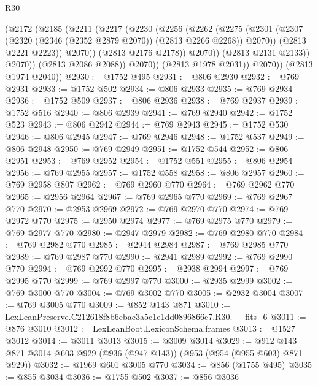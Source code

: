 \begin{lexlean}{R30}
\begin{coremodule}
                    (@2172
                      (@2185
                        (@2211
                          (@2217
                            (@2230
                              (@2256
                                (@2262
                                  (@2275
                                    (@2301
                                      (@2307
                                        (@2320 (@2346 (@2352 @2879 @2070)) (@2813 @2266 @2268))
                                        @2070))
                                    (@2813 @2221 @2223))
                                  @2070))
                              (@2813 @2176 @2178))
                            @2070))
                        (@2813 @2131 @2133))
                      @2070))
                  (@2813 @2086 @2088))
                @2070))
            (@2813 @1978 @2031))
          @2070))
      (@2813 @1974 @2040))
@2930 := @1752 @495
@2931 := @806 @2930
@2932 := @769 @2931
@2933 := @1752 @502
@2934 := @806 @2933
@2935 := @769 @2934
@2936 := @1752 @509
@2937 := @806 @2936
@2938 := @769 @2937
@2939 := @1752 @516
@2940 := @806 @2939
@2941 := @769 @2940
@2942 := @1752 @523
@2943 := @806 @2942
@2944 := @769 @2943
@2945 := @1752 @530
@2946 := @806 @2945
@2947 := @769 @2946
@2948 := @1752 @537
@2949 := @806 @2948
@2950 := @769 @2949
@2951 := @1752 @544
@2952 := @806 @2951
@2953 := @769 @2952
@2954 := @1752 @551
@2955 := @806 @2954
@2956 := @769 @2955
@2957 := @1752 @558
@2958 := @806 @2957
@2960 := @769 @2958 @807
@2962 := @769 @2960 @770
@2964 := @769 @2962 @770
@2965 := @2956 @2964
@2967 := @769 @2965 @770
@2969 := @769 @2967 @770
@2970 := @2953 @2969
@2972 := @769 @2970 @770
@2974 := @769 @2972 @770
@2975 := @2950 @2974
@2977 := @769 @2975 @770
@2979 := @769 @2977 @770
@2980 := @2947 @2979
@2982 := @769 @2980 @770
@2984 := @769 @2982 @770
@2985 := @2944 @2984
@2987 := @769 @2985 @770
@2989 := @769 @2987 @770
@2990 := @2941 @2989
@2992 := @769 @2990 @770
@2994 := @769 @2992 @770
@2995 := @2938 @2994
@2997 := @769 @2995 @770
@2999 := @769 @2997 @770
@3000 := @2935 @2999
@3002 := @769 @3000 @770
@3004 := @769 @3002 @770
@3005 := @2932 @3004
@3007 := @769 @3005 @770
@3009 := @852 @143 @871
@3010 := LexLeanPreserve.C212618f8b6ebac3a5c1e1dd0896866e7.R30.__fits_6
@3011 := @876 @3010
@3012 := LexLeanBoot.LexiconSchema.frames
@3013 := @1527 @3012
@3014 := @3011 @3013
@3015 := @3009 @3014
@3029 := @912 @143 @871 @3014 @603 @929 (@936 (@947 @143)) (@953 (@954 (@955 @603) @871 @929))
@3032 := @1969 @601 @3005 @770
@3034 := @856 (@1755 @495)
@3035 := @855 @3034
@3036 := @1755 @502
@3037 := @856 @3036

\end{coremodule}
\end{lexlean}

